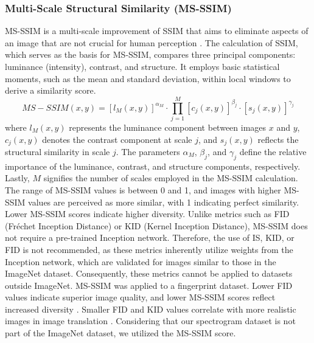 \documentclass[lettersize,journal]{IEEEtran}
\begin{document}
\subsubsection{Multi-Scale Structural Similarity (MS-SSIM)}
MS-SSIM is a multi-scale improvement of SSIM that aims to eliminate aspects of an image that are not crucial for human perception \cite{wang2003multiscale,ma2016group}. The calculation of SSIM, which serves as the basis for MS-SSIM, compares three principal components: luminance (intensity), contrast, and structure. It employs basic statistical moments, such as the mean and standard deviation, within local windows to derive a similarity score.
\begin{equation}
MS-SSIM(x,y)=\left[l_M (x,y)\right]^{\alpha_M}\cdot \prod_{j=1}^{M}\left[c_j(x,y)\right]^{\beta_j}\cdot \left[s_j (x,y)\right]^{\gamma_j}
\end{equation}
where $l_M (x,y)$ represents the luminance component between images $x$ and $y$, $c_j(x,y)$ denotes the contrast component at scale $j$, and $s_j(x,y)$ reflects the structural similarity in scale $j$. The parameters $\alpha_M$, $\beta_j$, and $\gamma_j$ define the relative importance of the luminance, contrast, and structure components, respectively. Lastly, $M$ signifies the number of scales employed in the MS-SSIM calculation\cite{arsenio2025recovering}.
The range of MS-SSIM values is between 0 and 1, and images with higher MS-SSIM values are perceived as more similar\cite{odena2017conditional}, with 1 indicating perfect similarity. Lower MS-SSIM scores indicate higher diversity\cite{guo2019autoembedding,wang2019improvingmmdgantrainingrepulsive}.
Unlike metrics such as FID (Fréchet Inception Distance) or KID (Kernel Inception Distance), MS-SSIM does not require a pre-trained Inception network\cite{fahim2020alightweight}. Therefore, the use of IS, KID, or FID is not recommended, as these metrics inherently utilize weights from the Inception network, which are validated for images similar to those in the ImageNet dataset. Consequently, these metrics cannot be applied to datasets outside ImageNet. MS-SSIM  was applied to a fingerprint dataset\cite{fahim2020alightweight}.
Lower FID values indicate superior image quality, and lower MS-SSIM scores reflect increased diversity \cite{guo2019autoembedding}. Smaller FID and KID values correlate with more realistic images in image translation \cite{torbunov2023rethinking}.
Considering that our spectrogram dataset is not part of the ImageNet dataset, we utilized the MS-SSIM score.
\end{document}
